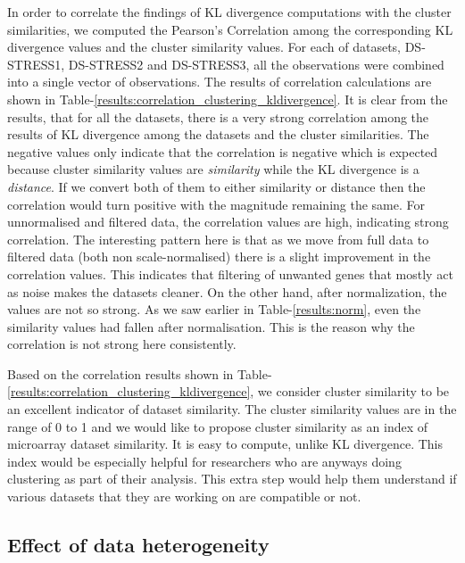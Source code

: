 In order to correlate the findings of \ac{KL} divergence computations with the cluster similarities, we computed the Pearson's Correlation among the corresponding KL divergence values and the cluster similarity values. For each of datasets, DS-STRESS1, DS-STRESS2 and DS-STRESS3, all the observations were combined into a single vector of observations. The results of correlation calculations are shown in Table-\ref{results:correlation_clustering_kldivergence}. It is clear from the results, that for all the datasets, there is a very strong correlation among the results of KL divergence among the datasets and the cluster similarities. The negative values only indicate that the correlation is negative which is expected because cluster similarity values are \textit{similarity} while the KL divergence is a \textit{distance}. If we convert both of them to either similarity or distance then the correlation would turn positive with the magnitude remaining the same. For unnormalised and filtered data, the correlation values are high, indicating strong correlation. The interesting pattern here is that as we move from full data to filtered data (both non scale-normalised) there is a slight improvement in the correlation values. This indicates that filtering of unwanted genes that mostly act as noise makes the datasets cleaner. On the other hand, after normalization, the values are not so strong. As we saw earlier in Table-\ref{results:norm}, even the similarity values had fallen after normalisation. This is the reason why the correlation is not strong here consistently.

Based on the correlation results shown in Table-\ref{results:correlation_clustering_kldivergence}, we consider cluster similarity to be an excellent indicator of dataset similarity. The cluster similarity values are in the range of 0 to 1 and we would like to propose cluster similarity as an index of microarray dataset similarity. It is easy to compute, unlike KL divergence. This index would be especially helpful for researchers who are anyways doing clustering as part of their analysis. This extra step would help them understand if various datasets that they are working on are compatible or not.

\subsection{Effect of data heterogeneity}


